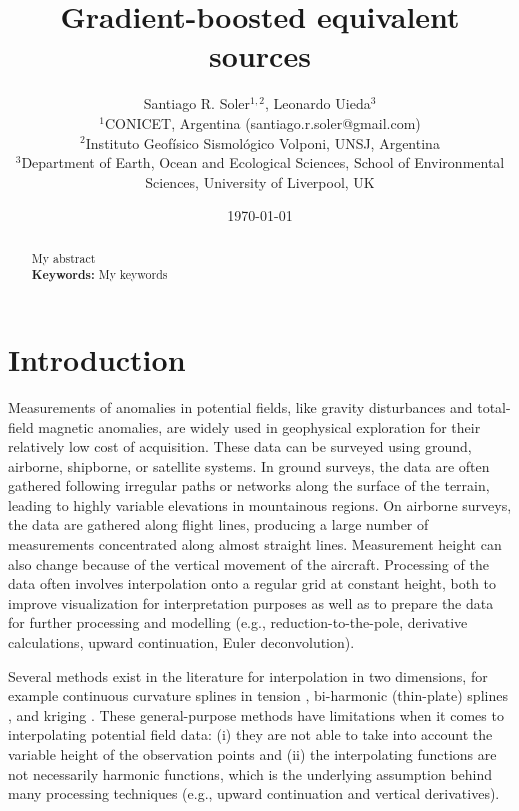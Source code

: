 \documentclass[twocolumn]{article}
\makeatletter
\newcommand{\Title}{%
    Gradient-boosted equivalent sources
}
\newcommand{\AuthorAffil}{%
    {\large
        Santiago R. Soler$^{1,2}$,
        Leonardo Uieda$^{3}$
    }
    \\[0.4cm]
    {\small $^{1}$CONICET, Argentina (santiago.r.soler@gmail.com)} \\
    {\small $^{2}$Instituto Geofísico Sismológico Volponi, UNSJ, Argentina} \\
    {\small $^{3}$Department of Earth, Ocean and Ecological Sciences, School of Environmental Sciences, University of Liverpool, UK} \\
}
\makeatother
\begin{document}
\title{\Title}
\author{\AuthorAffil}
\date{
    \normalsize
    \today
}
\maketitle

\begin{abstract}
    My abstract
    \\[0.5cm]
    \textbf{Keywords:}
    My keywords
\end{abstract}


\section{Introduction}

Measurements of anomalies in potential fields, like gravity disturbances and
total-field magnetic anomalies, are widely used in geophysical exploration for
their relatively low cost of acquisition.
These data can be surveyed using ground, airborne, shipborne, or satellite
systems.
In ground surveys, the data are often gathered following irregular paths or
networks along the surface of the terrain, leading to highly variable
elevations in mountainous regions.
On airborne surveys, the data are gathered along flight lines, producing a
large number of measurements concentrated along almost straight lines.
Measurement height can also change because of the vertical movement of the
aircraft.
Processing of the data often involves interpolation onto a regular grid at
constant height, both to improve visualization for interpretation purposes as
well as to prepare the data for further processing and modelling (e.g.,
reduction-to-the-pole, derivative calculations, upward continuation, Euler
deconvolution).

Several methods exist in the literature for interpolation in two dimensions,
for example continuous curvature splines in tension \citep{smith1990},
bi-harmonic (thin-plate) splines \citep{sandwell1987}, and kriging \citep{hansen1993}.
These general-purpose methods have limitations when it comes to interpolating
potential field data:
(i) they are not able to take into account the variable height of the
observation points and
(ii) the interpolating functions are not necessarily harmonic functions, which
is the underlying assumption behind many processing techniques
(e.g., upward continuation and vertical derivatives).
\end{document}
